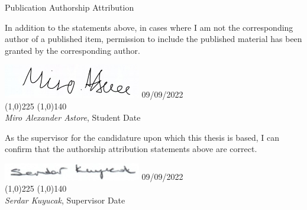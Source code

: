\newpage
\begin{center}
\begin{Large}
\begin{bfseries}
Publication Authorship Attribution
\end{bfseries}
\end{Large}
\end{center}

\vspace{0.3in}
\noindent In addition to the statements above, in cases where I am not the 
corresponding author of a published item, permission to include the published 
material has been granted by the corresponding author.

\vspace{1.in}


\includegraphics[width=6cm]{figures/miro_signature.png} \hspace{3.0cm} 09/09/2022\\
\noindent \line(1,0){225} \hspace{1.0cm} \line(1,0){140} \\
 {\em Miro Alexander Astore}, Student \hspace{3.65cm} Date
 
 \vspace{1in}

\noindent As the supervisor for the candidature upon which this thesis is based, 
I can confirm that the authorship attribution statements above are correct.

\vspace{1in}


\includegraphics[width=6cm]{figures/serdar_signature.png} \hspace{3.0cm} 09/09/2022\\
\noindent \line(1,0){225} \hspace{1.0cm} \line(1,0){140} \\
{\em Serdar Kuyucak}, Supervisor \hspace{5.7cm} Date
